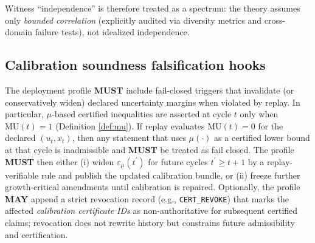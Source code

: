 \documentclass[11pt,a4paper]{article}
\newcommand{\MUST}{\textbf{MUST}}
\newcommand{\MAY}{\textbf{MAY}}
\newcommand{\eps}{\varepsilon}
\theoremstyle{definition}
\theoremstyle{remark}
\begin{document}
Witness ``independence'' is therefore treated as a spectrum: the theory assumes only \emph{bounded correlation} (explicitly audited via diversity metrics and cross-domain failure tests), not idealized independence.


\subsection{Calibration soundness falsification hooks}\label{sec:falsification_mu_soundness}
The deployment profile \MUST{} include fail-closed triggers that invalidate (or conservatively widen) declared uncertainty margins when violated by replay.
In particular, $\mu$-based certified inequalities are asserted at cycle $t$ only when $\mathrm{MU}(t)=1$ (Definition \ref{def:mu}).
If replay evaluates $\mathrm{MU}(t)=0$ for the declared $(u_t,x_t)$, then any statement that uses $\mu(\cdot)$ as a certified lower bound at that cycle is inadmissible and \MUST{} be treated as fail closed.
The profile \MUST{} then either (i) widen $\eps_\mu(t^\prime)$ for future cycles $t^\prime\ge t+1$ by a replay-verifiable rule and publish the updated calibration bundle, or (ii) freeze further growth-critical amendments until calibration is repaired.
Optionally, the profile \MAY{} append a strict revocation record (e.g., \texttt{CERT\_REVOKE}) that marks the affected \emph{calibration certificate IDs} as non-authoritative for subsequent certified claims; revocation does not rewrite history but constrains future admissibility and certification.
\end{document}
